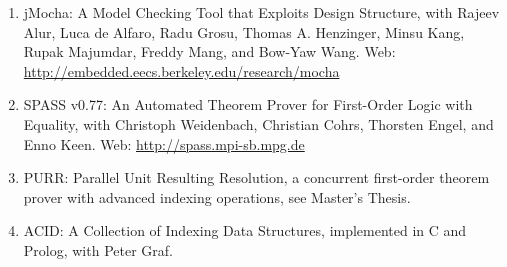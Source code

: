 {\begin{enumerate}
\item jMocha: A Model Checking Tool that Exploits Design Structure,
with Rajeev Alur, Luca de Alfaro, Radu Grosu, Thomas A. Henzinger,
Minsu Kang, Rupak Majumdar, Freddy Mang, and Bow-Yaw Wang.  Web:
\url{http://embedded.eecs.berkeley.edu/research/mocha}

\item SPASS v0.77: An Automated Theorem Prover for First-Order Logic with Equality,
with Christoph Weidenbach, Christian Cohrs, Thorsten Engel, and Enno
Keen.  Web: \url{http://spass.mpi-sb.mpg.de}

\item PURR: Parallel Unit Resulting Resolution, a concurrent first-order theorem prover
with advanced indexing operations, see Master's Thesis.

\item ACID: A Collection of Indexing Data Structures, implemented in C and Prolog,
with Peter Graf.
\end{enumerate}
}

